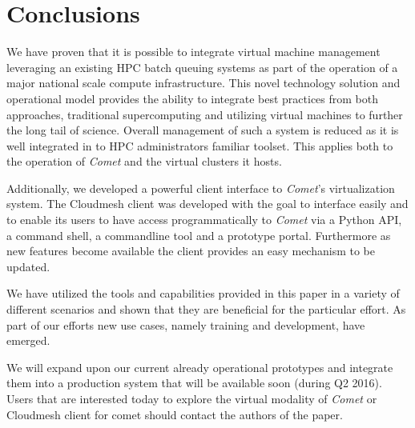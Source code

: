 


\section{Conclusions} \label{S:conclusion}

We have proven that it is possible to integrate virtual machine
management leveraging an existing HPC batch queuing systems as part of the
operation of a major national scale compute infrastructure. This novel technology solution and
operational model provides the ability to integrate best practices
from both approaches, traditional supercomputing and utilizing
virtual machines to further the long tail of science. Overall
management of such a system is reduced as it
is well integrated in to HPC administrators familiar toolset. This
applies both to the operation of {\em Comet} and the virtual clusters
it hosts.

Additionally, we developed a powerful client interface to {\em Comet}'s
virtualization system.  The Cloudmesh client was developed with the
goal to interface easily and to enable its users to have access
programmatically to {\em Comet} via a Python API, a command shell, a
commandline tool and a prototype portal. Furthermore as new features
become available the client provides an easy mechanism to be updated.

We have utilized the tools and capabilities provided in this paper in a
variety of different scenarios and shown that they are beneficial for
the particular effort. As part of our efforts new use cases, namely
training and development, have emerged.

We will expand upon our current already operational prototypes and
integrate them into a production system that will be available
soon (during Q2 2016). Users that are interested today to explore the virtual modality of
{\em Comet} or Cloudmesh client for comet should contact the authors of the
paper.
